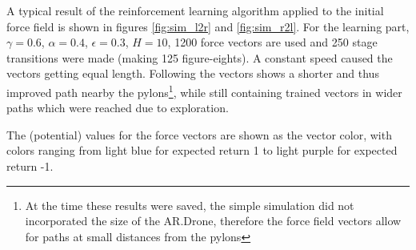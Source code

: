 \documentclass[11pt]{article}
\begin{document}
A typical result of the reinforcement learning algorithm applied to the initial force field is shown in figures \ref{fig:sim_l2r} and \ref{fig:sim_r2l}. For the learning part, $\gamma = 0.6$, $\alpha = 0.4$, $\epsilon = 0.3$, $H = 10$, 1200 force vectors are used and 250 stage transitions were made (making 125 figure-eights). A constant speed caused the vectors getting equal length. Following the vectors shows a shorter and thus improved path nearby the pylons\footnote{At the time these results were saved, the simple simulation did not incorporated the size of the AR.Drone, therefore the force field vectors allow for paths at small distances from the pylons}, while still containing trained vectors in wider paths which were reached due to exploration.

The (potential) values for the force vectors are shown as the vector color, with colors ranging from light blue for expected return 1 to light purple for expected return -1.
\end{document}
